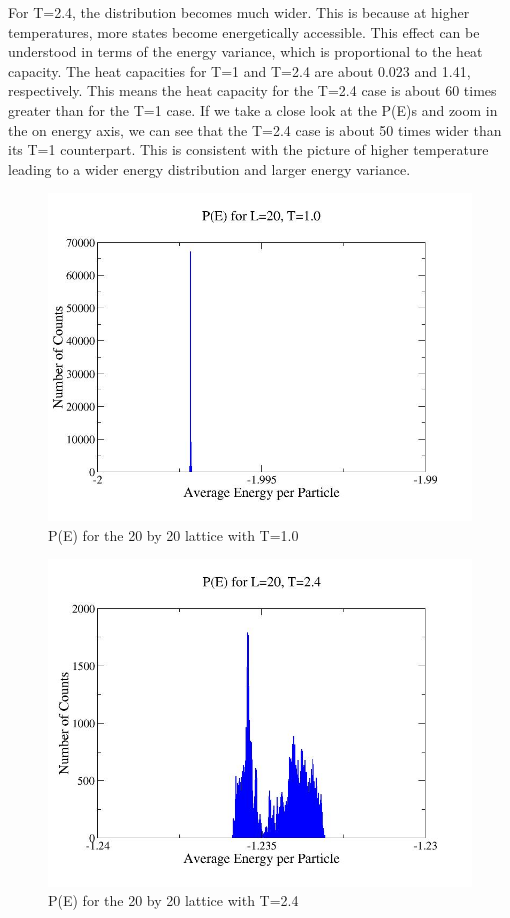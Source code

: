 \documentclass[%
oneside,                 %
final,                   %
10pt]{article}
\begin{document}
For T=2.4, the distribution becomes much wider.  This is because at higher temperatures, more states become energetically accessible.  This effect can be understood in terms of the energy variance, which is proportional to the heat capacity.  The heat capacities for T=1 and T=2.4 are about 0.023 and 1.41, respectively.  This means the heat capacity for the T=2.4 case is about 60 times greater than for the T=1 case.  If we take a close look at the P(E)s and zoom in the on energy axis, we can see that the T=2.4 case is about 50 times wider than its T=1 counterpart.  This is consistent with the picture of higher temperature leading to a wider energy distribution and larger energy variance. 

\begin{figure}[H]\label{fig:pe1}
  \centering
    \includegraphics[width=1.1 \textwidth]{pe1.jpg}
    \caption{P(E) for the 20 by 20 lattice with T=1.0}
\end{figure}


\begin{figure}[H]\label{fig:pe2}
  \centering
    \includegraphics[width=1.1 \textwidth]{p2.jpg}
    \caption{P(E) for the 20 by 20 lattice with T=2.4}
\end{figure}
\end{document}

